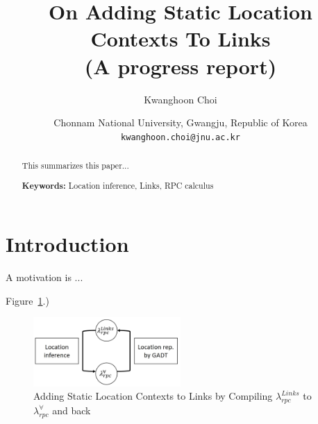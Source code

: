 \documentclass[a4paper]{article}
\title{On Adding Static Location Contexts To Links\\(A progress report)}
\author{Kwanghoon Choi}
\date{
  Chonnam National University, Gwangju, Republic of Korea
  \\ \texttt{kwanghoon.choi@jnu.ac.kr}\\[2ex]%
}
\theoremstyle{plain}
\newtheorem{theorem}{Theorem}
\theoremstyle{definition}
\newcommand{\polyrpc}{$\lambda_{rpc}^{\forall}$\xspace}
\newcommand{\linksrpc}{$\lambda_{rpc}^{Links}$\xspace}
\begin{document}
\maketitle
	
\begin{abstract}
This summarizes this paper...
		
\noindent\textbf{Keywords:} Location inference, Links, RPC calculus
\end{abstract}

	
\section{Introduction}
\label{sec:intro}

A motivation is ...

Figure~\ref{fig:addingstaticlocationcontexts}.)
\begin{figure}[ht]
        \centering
        \includegraphics[width=0.5\textwidth]{linksrpc.png}
        \caption{Adding Static Location Contexts to Links by Compiling \linksrpc to \polyrpc and back}
        \label{fig:addingstaticlocationcontexts}
\end{figure}



	
	
	
	
	
\end{document}
